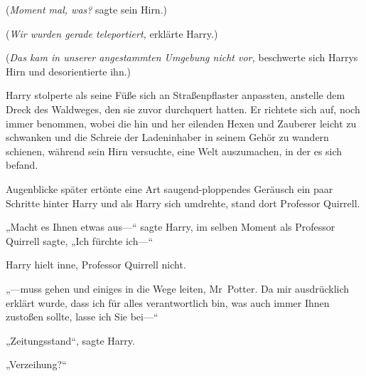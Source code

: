 (\emph{Moment mal, was?} sagte sein Hirn.)

(\emph{Wir wurden gerade teleportiert,} erklärte Harry.)

(\emph{Das kam in unserer angestammten Umgebung nicht vor,} beschwerte sich Harrys Hirn und desorientierte ihn.)

Harry stolperte als seine Füße sich an Straßenpflaster anpassten, anstelle dem Dreck des Waldweges, den sie zuvor durchquert hatten. Er richtete sich auf, noch immer benommen, wobei die hin und her eilenden Hexen und Zauberer leicht zu schwanken und die Schreie der Ladeninhaber in seinem Gehör zu wandern schienen, während sein Hirn versuchte, eine Welt auszumachen, in der es sich befand.

Augenblicke später ertönte eine Art saugend-ploppendes Geräusch ein paar Schritte hinter Harry und als Harry sich umdrehte, stand dort Professor Quirrell.

„Macht es Ihnen etwas aus—“ sagte Harry, im selben Moment als Professor Quirrell sagte, „Ich fürchte ich—“

Harry hielt inne, Professor Quirrell nicht.

„—muss gehen und einiges in die Wege leiten, Mr~Potter. Da mir ausdrücklich erklärt wurde, dass ich für alles verantwortlich bin, was auch immer Ihnen zustoßen sollte, lasse ich Sie bei—“

„Zeitungsstand“, sagte Harry.

„Verzeihung?“

